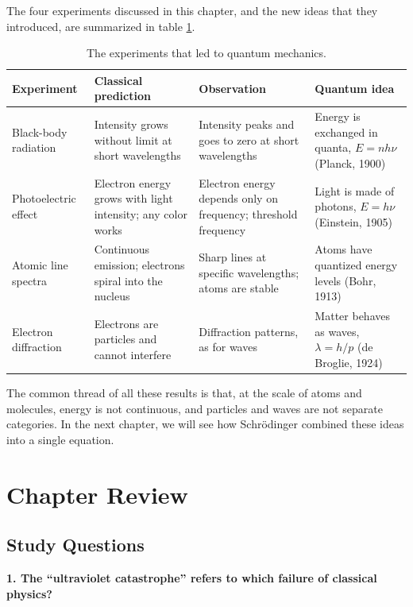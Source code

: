 \documentclass[
  english,
  9pt,
]{extbook}
\theoremstyle{definition}
\theoremstyle{definition}
\theoremstyle{definition}
\theoremstyle{definition}
\theoremstyle{remark}
\begin{document}
The four experiments discussed in this chapter, and the new ideas that they introduced, are summarized in table \ref{tab:tab1c2}.

\begin{table}

\caption{\label{tab:tab1c2}The experiments that led to quantum mechanics.}
\centering
\begin{tabular}[t]{l|l|l|l}
\hline
Experiment & Classical prediction & Observation & Quantum idea\\
\hline
Black-body radiation & Intensity grows without limit at short wavelengths & Intensity peaks and goes to zero at short wavelengths & Energy is exchanged in quanta, $E=nh\nu$ (Planck, 1900)\\
\hline
Photoelectric effect & Electron energy grows with light intensity; any color works & Electron energy depends only on frequency; threshold frequency & Light is made of photons, $E=h\nu$ (Einstein, 1905)\\
\hline
Atomic line spectra & Continuous emission; electrons spiral into the nucleus & Sharp lines at specific wavelengths; atoms are stable & Atoms have quantized energy levels (Bohr, 1913)\\
\hline
Electron diffraction & Electrons are particles and cannot interfere & Diffraction patterns, as for waves & Matter behaves as waves, $\lambda=h/p$ (de Broglie, 1924)\\
\hline
\end{tabular}
\end{table}

The common thread of all these results is that, at the scale of atoms and molecules, energy is not continuous, and particles and waves are not separate categories. In the next chapter, we will see how Schrödinger combined these ideas into a single equation.

\section{Chapter Review}\label{rev2}

\subsection{Study Questions}\label{quest2}

\textbf{1. The ``ultraviolet catastrophe'' refers to which failure of classical physics?}
\end{document}
